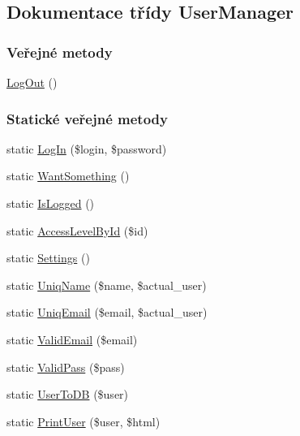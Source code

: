 \hypertarget{class_user_manager}{\subsection{Dokumentace třídy User\-Manager}
\label{class_user_manager}
}
\subsubsection*{Veřejné metody}
\begin{DoxyCompactItemize}
\item 
\hyperlink{class_user_manager_a6db6a45346931bb3981be2db41c91632}{Log\-Out} ()
\end{DoxyCompactItemize}
\subsubsection*{Statické veřejné metody}
\begin{DoxyCompactItemize}
\item 
static \hyperlink{class_user_manager_af9b7469e087532077755302c649c33f5}{Log\-In} (\$login, \$password)
\item 
static \hyperlink{class_user_manager_afb9466d8ab2c831f39dce61d75e311a2}{Want\-Something} ()
\item 
static \hyperlink{class_user_manager_a591da89b9f5821a5cd5b128053d85288}{Is\-Logged} ()
\item 
static \hyperlink{class_user_manager_ae27411cd0d85f59baacc609d2a68f6ef}{Access\-Level\-By\-Id} (\$id)
\item 
static \hyperlink{class_user_manager_a0d41a9f7e30ab5ef491473e165feba72}{Settings} ()
\item 
static \hyperlink{class_user_manager_affaf39c1c3d2737c120b42ea519426cd}{Uniq\-Name} (\$name, \$actual\-\_\-user)
\item 
static \hyperlink{class_user_manager_ad0ad8e9939e50edddd9e974166c64cae}{Uniq\-Email} (\$email, \$actual\-\_\-user)
\item 
static \hyperlink{class_user_manager_a4ba3218781f8d248ccf97b95dd728b66}{Valid\-Email} (\$email)
\item 
static \hyperlink{class_user_manager_a8db66f709a79d60e871d816253dabf1f}{Valid\-Pass} (\$pass)
\item 
static \hyperlink{class_user_manager_a9f8ffffb65641f622d58a6a68c2992db}{User\-To\-D\-B} (\$user)
\item 
static \hyperlink{class_user_manager_a90514aa811f656596a7940a4383c5307}{Print\-User} (\$user, \$html)
\end{DoxyCompactItemize}


